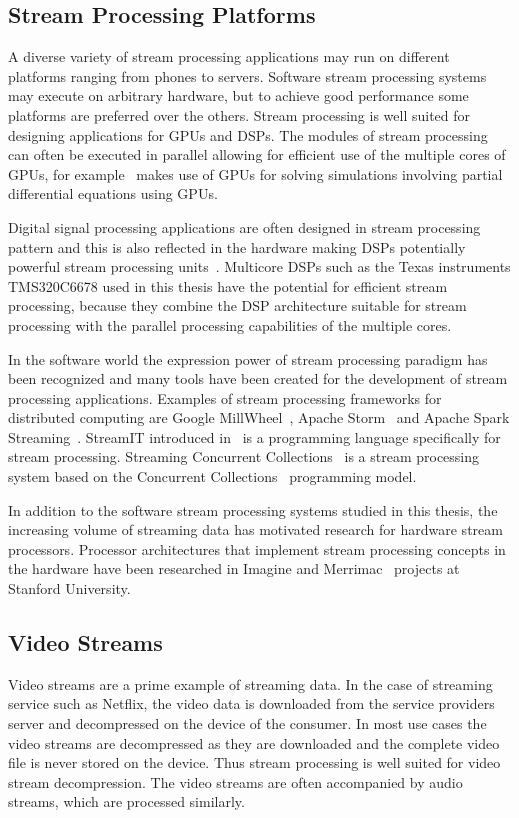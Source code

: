 \subsection{Stream Processing Platforms}
\label{subsec:stream-processing-platforms}
A diverse variety of stream processing applications may run on different platforms ranging from phones to servers. Software stream processing systems may execute on arbitrary hardware, but to achieve good performance some platforms are preferred over the others. Stream processing is well suited for designing applications for GPUs and DSPs. The modules of stream processing can often be executed in parallel allowing for efficient use of the multiple cores of GPUs, for example~\cite{goddeke2011fast} makes use of GPUs for solving simulations involving partial differential equations using GPUs.

Digital signal processing applications are often designed in stream processing pattern and this is also reflected in the hardware making DSPs potentially powerful stream processing units~\cite{lee2015introduction}. Multicore DSPs such as the Texas instruments TMS320C6678 used in this thesis have the potential for efficient stream processing, because they combine the DSP architecture suitable for stream processing with the parallel processing capabilities of the multiple cores.

In the software world the expression power of stream processing paradigm has been recognized and many tools have been created for the development of stream processing applications. Examples of stream processing frameworks for distributed computing are Google MillWheel~\cite{tyler2013millwheel}, Apache Storm~\cite{apache2016storm} and Apache Spark Streaming~\cite{apache2016spark}. StreamIT introduced in~\cite{thies2002streamit} is a programming language specifically for stream processing. Streaming Concurrent Collections~\cite{sbirlea2011scnc} is a stream processing system based on the Concurrent Collections~\cite{budimlic2010concurrent} programming model.

In addition to the software stream processing systems studied in this thesis, the increasing volume of streaming data has motivated research for hardware stream processors. Processor architectures that implement stream processing concepts in the hardware have been researched in Imagine \cite{kapasi2002imagine} and Merrimac~\cite{dally2003merrimac} projects at Stanford University.

\subsection{Video Streams}
\label{subsec:video-streams}
Video streams are a prime example of streaming data. In the case of streaming service such as Netflix, the video data is downloaded from the service providers server and decompressed on the device of the consumer. In most use cases the video streams are decompressed as they are downloaded and the complete video file is never stored on the device. Thus stream processing is well suited for video stream decompression. The video streams are often accompanied by audio streams, which are processed similarly.~\cite{richardson2002video}

